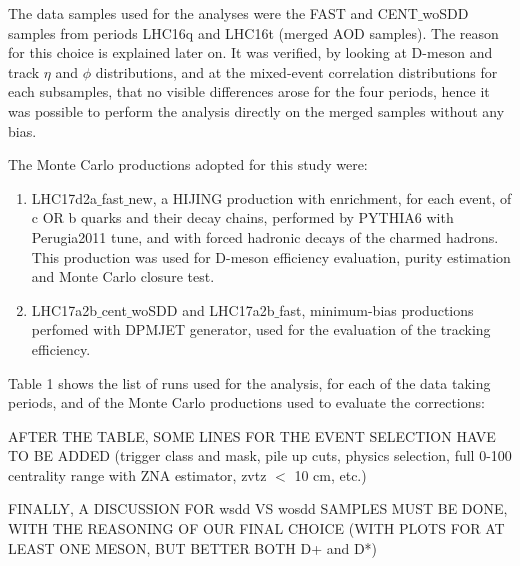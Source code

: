 The data samples used for the analyses were the FAST and CENT$\_$woSDD samples from periods LHC16q and LHC16t (merged AOD samples). The reason for this choice is explained later on. It was verified, by looking at D-meson and track $\eta$ and $\phi$ distributions, and at the mixed-event correlation distributions for each subsamples, that no visible differences arose for the four periods, hence it was possible to perform the analysis directly on the merged samples without any bias.

The Monte Carlo productions adopted for this study were:
 \begin{enumerate}
 \item LHC17d2a$\_$fast$\_$new, a HIJING production with enrichment, for each event, of c OR b quarks and their decay chains, performed by PYTHIA6 with Perugia2011 tune, and with forced hadronic decays of the charmed hadrons. This production was used for D-meson efficiency evaluation, purity estimation and Monte Carlo closure test.
 \item LHC17a2b$\_$cent$\_$woSDD and LHC17a2b$\_$fast, minimum-bias productions perfomed with DPMJET generator, used for the evaluation of the tracking efficiency.
\end{enumerate}

Table 1 shows the list of runs used for the analysis, for each of the data taking periods, and of the Monte Carlo productions used to evaluate the corrections:

AFTER THE TABLE, SOME LINES FOR THE EVENT SELECTION HAVE TO BE ADDED (trigger class and mask, pile up cuts, physics selection, full 0-100 centrality range with ZNA estimator, zvtz $<$ 10 cm, etc.)

FINALLY, A DISCUSSION FOR wsdd VS wosdd SAMPLES MUST BE DONE, WITH THE REASONING OF OUR FINAL CHOICE (WITH PLOTS FOR AT LEAST ONE MESON, BUT BETTER BOTH D+ and D*)

 \vspace{10 mm}

